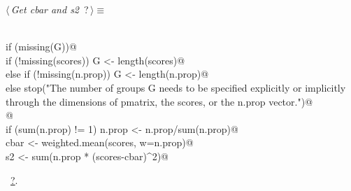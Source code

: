 \documentclass[reqno]{amsart}
\renewcommand{\NWtarget}[2]{\hypertarget{#1}{#2}}
\renewcommand{\NWlink}[2]{\hyperlink{#1}{#2}}
\begin{document}
\begin{flushleft} \small\label{scrap19}\raggedright\small
\NWtarget{nuweb?}{} $\langle\,${\itshape Get cbar and s2}\nobreak\ {\footnotesize {?}}$\,\rangle\equiv$
\vspace{-1ex}
\begin{list}{}{} \item
\mbox{}\verb@@\\
\mbox{}\verb@    if (missing(G)){@\\
\mbox{}\verb@      if (!missing(scores)) G <- length(scores)@\\
\mbox{}\verb@      else if (!missing(n.prop)) G <- length(n.prop)@\\
\mbox{}\verb@      else stop("The number of groups G needs to be specified explicitly or implicitly through the dimensions of pmatrix, the scores, or the n.prop vector.")@\\
\mbox{}\verb@    }@\\
\mbox{}\verb@    if (sum(n.prop) != 1) n.prop <- n.prop/sum(n.prop)@\\
\mbox{}\verb@    cbar <- weighted.mean(scores, w=n.prop)@\\
\mbox{}\verb@    s2 <- sum(n.prop * (scores-cbar)^2)@\\
\mbox{}\verb@@{\NWsep}
\end{list}
\vspace{-1.5ex}
\footnotesize
\begin{list}{}{\setlength{\itemsep}{-\parsep}\setlength{\itemindent}{-\leftmargin}}
\item \NWtxtMacroRefIn\ \NWlink{nuweb?}{?}.

\item{}
\end{list}
\vspace{4ex}
\end{flushleft}
\end{document}
